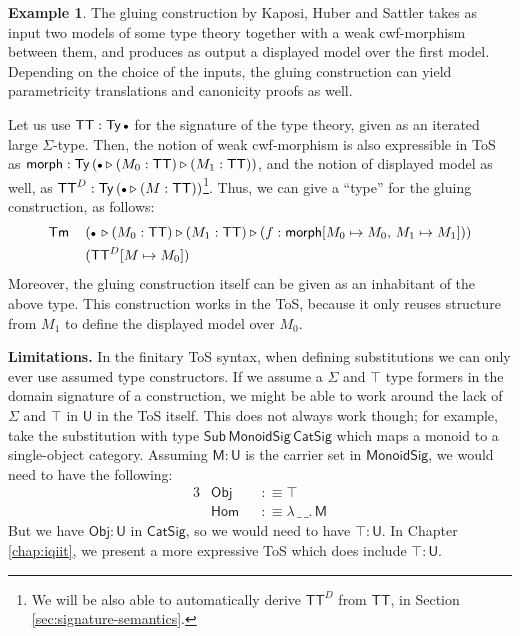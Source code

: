 \documentclass[12pt,a4paper,twoside,openany]{book}
\theoremstyle{remark}
\theoremstyle{definition}
\newtheorem{myexample}{Example}
\theoremstyle{theorem}
\newcommand{\ms}[1]{\mathsf{#1}}
\newcommand{\Sub}{\mathsf{Sub}}
\newcommand{\Tm}{\mathsf{Tm}}
\newcommand{\Ty}{\mathsf{Ty}}
\newcommand{\U}{\mathsf{U}}
\newcommand{\ext}{\triangleright}
\newcommand{\emptycon}{\scaleobj{.75}\bullet}
\newcommand{\Obj}{\ms{Obj}}
\newcommand{\defn}{:\equiv}
\begin{document}
\begin{myexample}
\label{ex:gluing}
The gluing construction by Kaposi, Huber and Sattler \cite{gluing} takes as
input two models of some type theory together with a weak cwf-morphism between
them, and produces as output a displayed model over the first model. Depending
on the choice of the inputs, the gluing construction can yield parametricity
translations and canonicity proofs as well.

Let us use $\ms{TT} : \Ty\,\emptycon$ for the signature of the type theory,
given as an iterated large $\Sigma$-type. Then, the notion of weak cwf-morphism
is also expressible in ToS as $\ms{morph} : \Ty\,(\emptycon\ext(M_0 :
\ms{TT})\ext(M_1 : \ms{TT}))$, and the notion of displayed model as well, as
$\ms{TT}^D : \Ty\,(\emptycon\ext(M : \ms{TT}))$\footnote{We will be also able to automatically derive $\ms{TT}^D$ from $\ms{TT}$, in Section \ref{sec:signature-semantics}.}. Thus, we can give a ``type''
for the gluing construction, as follows:
\begin{alignat*}{3}
  &\Tm\,&&(\emptycon\,\ext (M_0 : \ms{TT}) \ext (M_1 : \ms{TT}) \ext (f : \ms{morph}[M_0 \mapsto M_0,\,M_1 \mapsto M_1]))\\
  & && (\ms{TT}^D[M \mapsto M_0])
\end{alignat*}
Moreover, the gluing construction itself can be given as an inhabitant of the
above type. This construction works in the ToS, because it only reuses structure
from $M_1$ to define the displayed model over $M_0$.
\end{myexample}

\textbf{Limitations.}
In the finitary ToS syntax, when defining substitutions we can only ever use
assumed type constructors. If we assume a $\Sigma$ and $\top$ type formers in
the domain signature of a construction, we might be able to work around the lack
of $\Sigma$ and $\top$ in $\U$ in the ToS itself. This does not always work
though; for example, take the substitution with type
$\Sub\,\ms{MonoidSig}\,\ms{CatSig}$ which maps a monoid to a single-object
category. Assuming $\ms{M} : \U$ is the carrier set in $\ms{MonoidSig}$, we
would need to have the following:
\begin{alignat*}{3}
  &\ms{Obj} &&\defn \top \\
  &\ms{Hom} &&\defn \lambda\,\_\,\_.\, \ms{M}
\end{alignat*}
But we have $\Obj : \U$ in $\ms{CatSig}$, so we would need to have $\top : \U$.
In Chapter \ref{chap:iqiit}, we present a more expressive ToS which does include
$\top : \U$.
\end{document}
